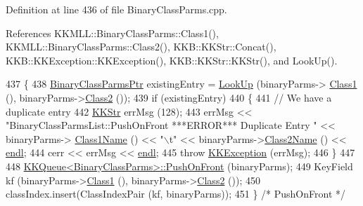 Definition at line 436 of file Binary\+Class\+Parms.\+cpp.



References K\+K\+M\+L\+L\+::\+Binary\+Class\+Parms\+::\+Class1(), K\+K\+M\+L\+L\+::\+Binary\+Class\+Parms\+::\+Class2(), K\+K\+B\+::\+K\+K\+Str\+::\+Concat(), K\+K\+B\+::\+K\+K\+Exception\+::\+K\+K\+Exception(), K\+K\+B\+::\+K\+K\+Str\+::\+K\+K\+Str(), and Look\+Up().


\begin{DoxyCode}
437 \{
438   \hyperlink{class_k_k_m_l_l_1_1_binary_class_parms}{BinaryClassParmsPtr}  existingEntry = \hyperlink{class_k_k_m_l_l_1_1_binary_class_parms_list_aab855a58369c229e40fa4b9248931a7e}{LookUp} (binaryParms->
      \hyperlink{class_k_k_m_l_l_1_1_binary_class_parms_aa8519ac2f7f7e4553143e12786209415}{Class1} (), binaryParms->\hyperlink{class_k_k_m_l_l_1_1_binary_class_parms_a38ea0c5dd0416d6aef402befeaf7a220}{Class2} ());
439   \textcolor{keywordflow}{if}  (existingEntry)
440   \{
441     \textcolor{comment}{// We have a duplicate entry}
442     \hyperlink{class_k_k_b_1_1_k_k_str}{KKStr}  errMsg (128);
443     errMsg << \textcolor{stringliteral}{"BinaryClassParmsList::PushOnFront   ***ERROR***  Duplicate Entry   "} << binaryParms->
      \hyperlink{class_k_k_m_l_l_1_1_binary_class_parms_a2cc986dba48d87b704d539d00fe25c76}{Class1Name} () << \textcolor{stringliteral}{"\(\backslash\)t"} << binaryParms->\hyperlink{class_k_k_m_l_l_1_1_binary_class_parms_ac587f3be83bd1007dceb8224a977acf9}{Class2Name} () << \hyperlink{namespace_k_k_b_ad1f50f65af6adc8fa9e6f62d007818a8}{endl};
444     cerr << errMsg << \hyperlink{namespace_k_k_b_ad1f50f65af6adc8fa9e6f62d007818a8}{endl};
445     \textcolor{keywordflow}{throw}  \hyperlink{class_k_k_b_1_1_k_k_exception}{KKException} (errMsg);
446   \}
447 
448   \hyperlink{class_k_k_b_1_1_k_k_queue}{KKQueue<BinaryClassParms>::PushOnFront} (binaryParms);
449   KeyField kf (binaryParms->\hyperlink{class_k_k_m_l_l_1_1_binary_class_parms_aa8519ac2f7f7e4553143e12786209415}{Class1} (), binaryParms->\hyperlink{class_k_k_m_l_l_1_1_binary_class_parms_a38ea0c5dd0416d6aef402befeaf7a220}{Class2} ());
450   classIndex.insert(ClassIndexPair (kf, binaryParms));
451 \}  \textcolor{comment}{/* PushOnFront */}
\end{DoxyCode}
